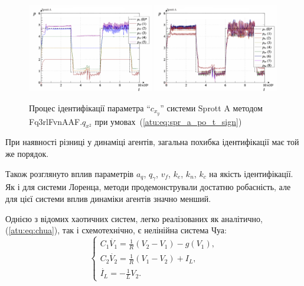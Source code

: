 \documentclass[a4paper,13pt]{atuaref}
\begin{document}
\begin{figure}[ht!]
  \centerline{
    \includegraphics[width=0.49\textwidth]{p5/p/cha/spr_a/Fq3rlFvnAAF_x2/sprott_a_id-p_t_pi_Fq3rlFvnAAF_sign_xl.png}
    \hfill
    \includegraphics[width=0.49\textwidth]{p5/p/cha/spr_a/Fq3rlFvnAAF_x2/sprott_a_id-p_t_p_Fq3rlFvnAAF_sign_xl.png}
  }
  \caption{Процес ідентифікації параметра ``$c_{x_y}$'' системи Sprott A методом Fq3rlFvnAAF.$q_{x^2}$ при умовах~(\ref{atu:eq:spr_a_po_t_sign})}
  \label{atu:f:spr_a_id_Fq3rlFvnAAF.q_x2_sign}
\end{figure}

При наявності різниці у динаміці агентів, загальна похибка ідентифікації
має той же порядок.

Також розглянуто вплив параметрів $a_q$, $q_\gamma$, $v_f$, $k_e$, $k_n$, $k_c$
на якість ідентифікації. Як і для системи Лоренца, методи
продемонстрували достатню робасність, але для цієї системи
вплив динаміки агентів значно менший.

Однією з відомих хаотичних систем, легко реалізованих як аналітично,
(\ref{atu:eq:chua}), так і схемотехнічно, є нелінійна система Чуа:
%
\begin{equation}
\begin{cases}
  C_1 \dot{V_1}  = \frac{1}{R} ( V_2 - V_1 ) - g(V_1), \\
  C_2 \dot{V_2}  = \frac{1}{R} ( V_1 - V_2 ) + I_L, \\
  \dot{I_L}      = - \frac{1}{L} V_2 .
\end{cases}
\label{atu:eq:chua}
\end{equation}
\end{document}
